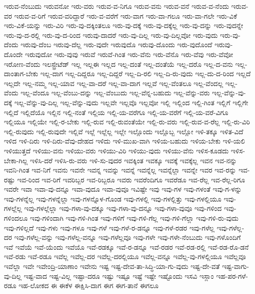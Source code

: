 {ಇರುವ-ನೆಂಬುದು
ಇರುವನೋ
ಇರು-ವರು
ಇರುವ-ವ-ನಿಗೂ
ಇರುವ-ವನು
ಇರುವ-ವನೆ
ಇರುವ-ವ-ನೆಂದು
ಇರುವ-ವರ
ಇರುವ-ವ-ರಿಗೆ
ಇರುವ-ವರಿದ್ದಾರೆ
ಇರು-ವ-ವರೆಗೆ
ಇರು-ವಾಗ
ಇರು-ವಾ-ಗಲೂ
ಇರು-ವಾ-ಗಲೇ
ಇರು-ವಿಕೆ
ಇರು-ವಿಕೆ-ಯನ್ನು
ಇರು-ವಿರಿ
ಇರು-ವು-ದಕ್ಕಿಂತಲೂ
ಇರು-ವು-ದಕ್ಕೆ
ಇರು-ವು-ದಕ್ಕೆಲ್ಲ
ಇರು-ವು-ದನ್ನು
ಇರು-ವುದನ್ನೇ
ಇರು-ವು-ದ-ರಲ್ಲಿ
ಇರು-ವು-ದ-ರಿಂದ
ಇರುವು-ದಾದರೆ
ಇರು-ವು-ದಿಲ್ಲ
ಇರು-ವು-ದಿಲ್ಲವೋ
ಇರು-ವುದು
ಇರು-ವು-ದೆಂದು
ಇರುವು-ದೆಂಬ
ಇರುವು-ದೆಲ್ಲ
ಇರು-ವುದೇ
ಇರುವುದೊ
ಇರುವು-ದೊಂದು
ಇರು-ವುದೊಂದೆ
ಇರುವು-ದೊಂದೇ
ಇರುವುದೋ
ಇರು-ವುವು
ಇರುವೆ
ಇರುವೆ-ಗಿಂತ
ಇರು-ವೆನು
ಇರು-ವೆನೊ
ಇರು-ವೆವು
ಇರು-ವೆವೋ
ಇರೋಣ-ವೆಂದು
ಇಲಸ್ಟ್ರೇಟೆಡ್
ಇಲ್ಲ
ಇಲ್ಲಈ
ಇಲ್ಲದ
ಇಲ್ಲ-ದಂತೆ
ಇಲ್ಲ-ದಂತೆಯೆ
ಇಲ್ಲ-ದರೊ
ಇಲ್ಲ-ದ-ವನು
ಇಲ್ಲ-ದಾಂತಾಗ-ಬೇಕು
ಇಲ್ಲ-ದಾಗ
ಇಲ್ಲ-ದಿದ್ದರೂ
ಇಲ್ಲ-ದಿದ್ದರೆ
ಇಲ್ಲ-ದಿ-ರಲಿ
ಇಲ್ಲ-ದಿ-ರು-ವುದು
ಇಲ್ಲ-ದು-ದ-ರಿಂದ
ಇಲ್ಲದೆ
ಇಲ್ಲದೇ
ಇಲ್ಲ-ನಮ್ಮ
ಇಲ್ಲ-ಯಾವ
ಇಲ್ಲ-ವಾ-ದರೆ
ಇಲ್ಲ-ವಾ-ದಾಗ
ಇಲ್ಲವೆ
ಇಲ್ಲ-ವೆಂತಲೂ
ಇಲ್ಲ-ವೆಂದಲ್ಲ
ಇಲ್ಲ-ವೆಂದು
ಇಲ್ಲ-ವೆಂದೂ
ಇಲ್ಲ-ವೆಂಬು-ದನ್ನು
ಇಲ್ಲ-ವೆಂಬುದು
ಇಲ್ಲ-ವೆನ್ನ-ಬಹುದು
ಇಲ್ಲ-ವೆನ್ನು-ವರು
ಇಲ್ಲ-ವೆನ್ನು-ವು-ದಕ್ಕೆ
ಇಲ್ಲ-ವೆನ್ನು-ವು-ದಿಲ್ಲ
ಇಲ್ಲ-ವೆನ್ನು-ವುದು
ಇಲ್ಲವೇ
ಇಲ್ಲವೊ
ಇಲ್ಲವೋ
ಇಲ್ಲಿ
ಇಲ್ಲಿಂದ
ಇಲ್ಲಿ-ಗಿಂತ
ಇಲ್ಲಿಗೆ
ಇಲ್ಲಿಗೇ
ಇಲ್ಲಿದೆ
ಇಲ್ಲಿದೆಯೊ
ಇಲ್ಲಿನ
ಇಲ್ಲಿ-ನಂತೆ
ಇಲ್ಲಿಯ
ಇಲ್ಲಿ-ಯ-ವರೆಗೂ
ಇಲ್ಲಿ-ಯ-ವರೆಗೆ
ಇಲ್ಲಿ-ಯ-ವರೆ-ವಿಗೂ
ಇಲ್ಲಿಯೂ
ಇಲ್ಲಿಯೇ
ಇಲ್ಲಿ-ರ-ಬೇಕು
ಇಲ್ಲಿ-ರುವ
ಇಲ್ಲಿ-ರುವಂತೆಯೇ
ಇಲ್ಲಿ-ರು-ವರು
ಇಲ್ಲಿ-ರುವ-ವ-ರೆಲ್ಲ
ಇಲ್ಲಿ-ರು-ವಿರಿ
ಇಲ್ಲಿ-ರುವುದು
ಇಲ್ಲಿ-ರುವುದೇ
ಇಲ್ಲಿವೆ
ಇಲ್ಲೆ
ಇಲ್ಲೆಲ್ಲ
ಇಲ್ಲೇ
ಇಲ್ಲೊಂದು
ಇಲ್ಲೊಬ್ಬ
ಇಲ್ಲೋ
ಇಳಿ-ತಕ್ಕೂ
ಇಳಿತ-ವಿದೆ
ಇಳಿದ
ಇಳಿ-ದಿರು
ಇಳಿ-ದಿರು-ವೆವು-ದೇಹದ
ಇಳಿದು
ಇಳಿ-ಮುಖ-ವಾಗಿ
ಇಳಿಯ-ಬಹುದು
ಇಳಿಯ-ಬೇಕು
ಇಳಿ-ಯಲಿ
ಇಳಿಯುತ್ತದೆ
ಇಳಿಯು-ವನು
ಇಳಿಯು-ವರು
ಇಳಿಯು-ವಿರಿ
ಇಳಿಯು-ವುದು
ಇಳಿಯು-ವೆನು
ಇಳಿಸ-ಕೂಡದು
ಇಳಿಸ-ಬೇಕಾ-ಗಿಲ್ಲ
ಇಳಿಸಿ-ದರೆ
ಇಳಿಸಿ-ರು-ವರು
ಇಳಿ-ಸು-ವುದರ
ಇವಕ್ಕಿಂತ
ಇವಕ್ಕೂ
ಇವಕ್ಕೆ
ಇವಕ್ಕೆಲ್ಲ
ಇವನ
ಇವ-ನನ್ನು
ಇವನಿ-ಗಿಂತ
ಇವ-ನಿಗೆ
ಇವನು
ಇವನೇ
ಇವನ್ನ
ಇವನ್ನು
ಇವನ್ನೆ
ಇವನ್ನೆಲ್ಲ
ಇವನ್ನೆಲ್ಲಾ
ಇವನ್ನೇ
ಇವರ
ಇವ-ರನ್ನು
ಇವ-ರಷ್ಟು
ಇವ-ರಿಂದ
ಇವ-ರಿಗೆ
ಇವರಿಬ್ಬರ
ಇವ-ರಿಬ್ಬರೂ
ಇವರು
ಇವರೆಂದಿಗೂ
ಇವರೆಡೂ
ಇವ-ರೆಲ್ಲ
ಇವ-ರೆಲ್ಲ-ರಿಗೂ
ಇವರೇ
ಇವಾ
ಇವಾ-ವು-ದನ್ನೂ
ಇವಾ-ವುದೂ
ಇವಾ-ವುವೂ
ಇವಿಷ್ಟೇ
ಇವು
ಇವು-ಗಳ
ಇವು-ಗಳಂತೆ
ಇವು-ಗ-ಳನ್ನು
ಇವು-ಗಳನ್ನೆಲ್ಲ
ಇವು-ಗಳನ್ನೆಲ್ಲಾ
ಇವು-ಗಳನ್ನೊಳ-ಗೊಂಡ
ಇವು-ಗಳಲ್ಲಿ
ಇವು-ಗಳಲ್ಲಿತ್ತು
ಇವು-ಗಳಲ್ಲಿಯೂ
ಇವು-ಗಳಲ್ಲೆಲ್ಲ
ಇವು-ಗಳಲ್ಲೆಲ್ಲಾ
ಇವು-ಗಳಾ-ವು-ದಕ್ಕೂ
ಇವು-ಗಳಾ-ವು-ದನ್ನೂ
ಇವು-ಗಳಾ-ವುವೂ
ಇವು-ಗಳಿಂದ
ಇವು-ಗಳಿಂದಲೂ
ಇವು-ಗಳಿಂದಾಗಿ
ಇವು-ಗಳಿ-ಗಿಂತ
ಇವು-ಗಳಿಗೆ
ಇವು-ಗಳಿ-ಗೆಲ್ಲ
ಇವು-ಗಳಿ-ಗೆಲ್ಲಾ
ಇವು-ಗಳಿ-ರು-ವುದು
ಇವು-ಗಳಿಲ್ಲದೆ
ಇವು-ಗಳು
ಇವು-ಗಳೂ
ಇವು-ಗಳೆ
ಇವು-ಗಳೆ-ರ-ಡನ್ನೂ
ಇವು-ಗಳೆ-ರಡರ
ಇವು-ಗಳೆಲ್ಲ
ಇವು-ಗಳೆಲ್ಲ-ದರ
ಇವು-ಗಳೆಲ್ಲ-ವನ್ನು
ಇವು-ಗಳೆಲ್ಲ-ವನ್ನೂ
ಇವು-ಗಳೆಲ್ಲವೂ
ಇವು-ಗಳೇ
ಇವು-ಗಳೇ-ನೆಂಬುದು
ಇವು-ಗಳೊಂದಿಗೆ
ಇವೆ
ಇವೆಯೆ
ಇವೆ-ಯೆಂದು
ಇವೆಯೊ
ಇವೆ-ರಡಕ್ಕೂ
ಇವೆ-ರ-ಡನ್ನೂ
ಇವೆ-ರಡರ
ಇವೆ-ರಡ-ರಲ್ಲಿ
ಇವೆ-ರಡ-ರೊ-ಡನೆ
ಇವೆ-ರಡು
ಇವೆ-ರಡೂ
ಇವೆಲ್ಲ
ಇವೆಲ್ಲ-ದರ
ಇವೆಲ್ಲ-ದರಲ್ಲಿಯೂ
ಇವೆಲ್ಲ-ವನ್ನೂ
ಇವೆಲ್ಲ-ವು-ಗಳಲ್ಲಿಯೂ
ಇವೆಲ್ಲವೂ
ಇವೆಲ್ಲಾ
ಇವೇ
ಇವೇಂದ್ರಿ-ಯಾಣಾಂ
ಇವೇನು
ಇಷ್ಟ
ಇಷ್ಟ-ದೇವ-ತಾ-ಸಿದ್ಧಿ-ಯಾ-ಗು-ವುದು
ಇಷ್ಟ-ದೇ-ವತೆ
ಇಷ್ಟ-ವಾಗು-ವು-ದಿಲ್ಲ
ಇಷ್ಟ-ವಾದ
ಇಷ್ಟ-ವಿಲ್ಲ
ಇಷ್ಟಾ-ದರೂ
ಇಷ್ಟು
ಇಷ್ಟೂ
ಇಷ್ಟೆ
ಇಷ್ಟೇ
ಇಷ್ಟೊಂದು
ಇಸವಿ
ಇಸ್ಲಾಂ
ಇಹ-ಪರ-ಗಳೆ-ರಡೂ
ಇಹ-ಲೋಕದ
ಈ
ಈಕೆಳ
ಈಕ್ಷಿಸಿ-ದಾಗ
ಈಗ
ಈಗ-ತಾನೆ
ಈಗಲೂ
}
